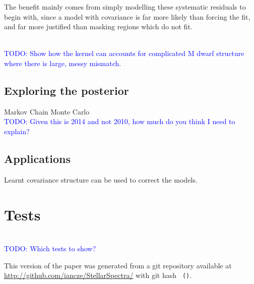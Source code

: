 \documentclass[iop,floatfix]{emulateapj}
\newcommand{\todo}[1]{ \textcolor{Blue}{\\TODO: #1}}
\begin{document}
The benefit mainly comes from simply modelling these systematic residuals to
 begin with, since a model with covariance is far more likely than forcing the
 fit, and far more justified than masking regions which do not fit.

\todo{Show how the kernel can accounts for complicated M dwarf structure where
 there is large, messy mismatch.}

\subsection{Exploring the posterior}
Markov Chain Monte Carlo
\todo{Given this is 2014 and not 2010, how much do you think I need to explain?}

\subsection{Applications}
Learnt covariance structure can be used to correct the models.

\section{Tests}
\todo{Which tests to show?}

This version of the paper was generated
 from a git repository available at \url{http://github.com/iancze/StellarSpectra/}
 with git hash \texttt{\githash\,(\gitdate)}.



\end{document}
